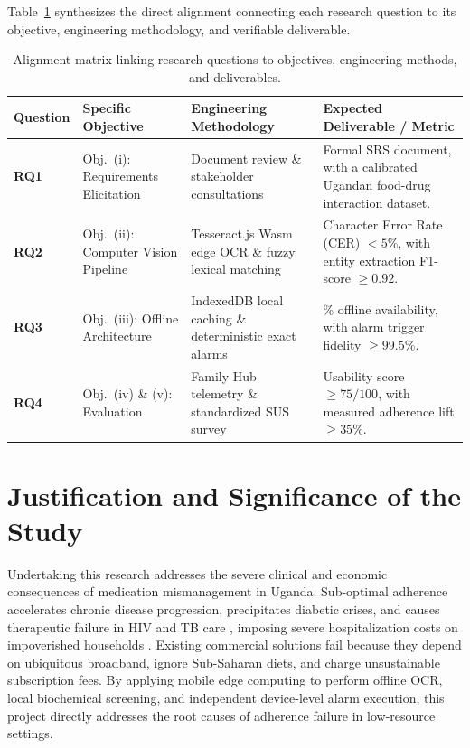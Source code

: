 Table~\ref{tab:rq_alignment} synthesizes the direct alignment connecting each research question to its objective, engineering methodology, and verifiable deliverable.

\begin{table}[!htbp]
  \centering
  \caption{Alignment matrix linking research questions to objectives, engineering methods, and deliverables.}
  \label{tab:rq_alignment}
  \footnotesize
  \setlength{\tabcolsep}{3.5pt}
  \begin{tabularx}{\textwidth}{@{} l >{\raggedright\arraybackslash}p{3.2cm} >{\raggedright\arraybackslash}p{3.4cm} >{\raggedright\arraybackslash}X @{}}
    \toprule
    \textbf{Question} & \textbf{Specific Objective} & \textbf{Engineering Methodology} & \textbf{Expected Deliverable / Metric} \\
    \midrule
    \textbf{RQ1} & Obj.~(i): Requirements Elicitation & Document review \& stakeholder consultations & Formal SRS document, with a calibrated Ugandan food-drug interaction dataset. \\
    \midrule
    \textbf{RQ2} & Obj.~(ii): Computer Vision Pipeline & Tesseract.js Wasm edge OCR \& fuzzy lexical matching & Character Error Rate (CER) $< 5\%$, with entity extraction F1-score $\ge 0.92$. \\
    \midrule
    \textbf{RQ3} & Obj.~(iii): Offline Architecture & IndexedDB local caching \& deterministic exact alarms & 100\% offline availability, with alarm trigger fidelity $\ge 99.5\%$. \\
    \midrule
    \textbf{RQ4} & Obj.~(iv) \& (v): Evaluation & Family Hub telemetry \& standardized SUS survey & Usability score $\ge 75/100$, with measured adherence lift $\ge 35\%$. \\
    \bottomrule
  \end{tabularx}
\end{table}

\section{Justification and Significance of the Study}

Undertaking this research addresses the severe clinical and economic consequences of medication mismanagement in Uganda. Sub-optimal adherence accelerates chronic disease progression, precipitates diabetic crises, and causes therapeutic failure in HIV and TB care \cite{who2003adherence, haberer2013realtime}, imposing severe hospitalization costs on impoverished households \cite{moh2023performance}. Existing commercial solutions fail because they depend on ubiquitous broadband, ignore Sub-Saharan diets, and charge unsustainable subscription fees. By applying mobile edge computing to perform offline OCR, local biochemical screening, and independent device-level alarm execution, this project directly addresses the root causes of adherence failure in low-resource settings.

